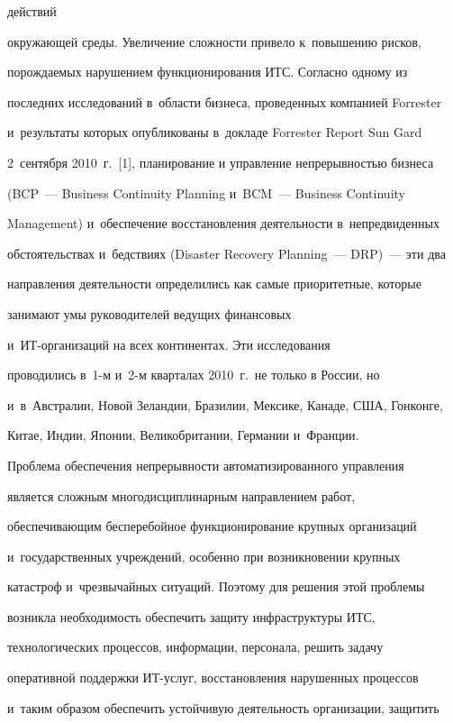 действий


окружающей среды. Увеличение сложности привело к~повышению рисков,


по\-рож\-да\-емых нарушением функционирования ИТС. Согласно одному из


последних исследований в~области бизнеса, проведенных компанией Forrester


и~результаты которых опубликованы в~докладе Forrester Report Sun Gard


2~сентября 2010~г.~[1], планирование и управление непрерывностью бизнеса


(BCP~--- Business Continuity Planning и~BCM~--- Business Continuity


Management) и~обеспечение восстановления деятельности в~непредвиденных


обстоятельствах и~бедстви\-ях (Disaster Recovery Planning~--- DRP)~--- эти два


направления деятельности определились как самые приоритетные, которые


занимают умы руководителей ведущих финансовых


  и~ИТ-ор\-га\-ни\-за\-ций на всех континентах. Эти исследования


проводились в~1-м и~2-м кварталах 2010~г.\ не только в России, но


и~в~Австралии, Новой Зеландии, Бразилии, Мексике, Канаде, США, Гонконге,


Китае, Индии, Японии, Великобритании, Германии и~Франции.





  Проблема обеспечения непрерывности автоматизированного управ\-ле\-ния


является сложным многодисциплинарным направлением работ,


обеспечи\-ва\-ющим бесперебойное функционирование крупных организаций


и~государственных учреждений, особенно при возникновении крупных


катастроф и~чрезвычайных ситуаций. Поэтому для решения этой проблемы


возникла необходимость обеспечить защиту инфраструктуры ИТС,


технологических процессов, информации, персонала, решить задачу


оперативной поддержки ИТ-услуг, восстановления нарушенных процессов


и~таким образом обеспечить устойчивую деятельность организации, защитить


